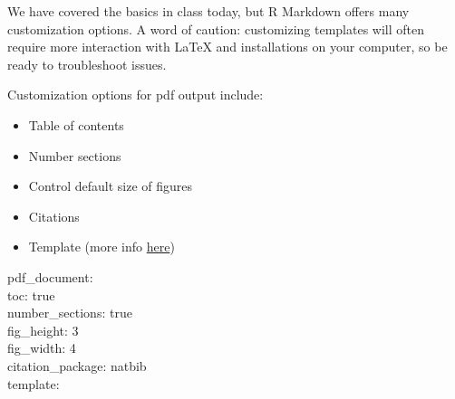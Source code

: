 \documentclass[
]{article}
\providecommand{\tightlist}{%
  \setlength{\itemsep}{0pt}\setlength{\parskip}{0pt}}
\begin{document}
We have covered the basics in class today, but R Markdown offers many
customization options. A word of caution: customizing templates will
often require more interaction with LaTeX and installations on your
computer, so be ready to troubleshoot issues.

Customization options for pdf output include:

\begin{itemize}
\tightlist
\item
  Table of contents
\item
  Number sections
\item
  Control default size of figures
\item
  Citations
\item
  Template (more info
  \href{http://jianghao.wang/post/2017-12-08-rmarkdown-templates/}{here})
\end{itemize}

pdf\_document:\\
toc: true\\
number\_sections: true\\
fig\_height: 3\\
fig\_width: 4\\
citation\_package: natbib\\
template:
\end{document}
